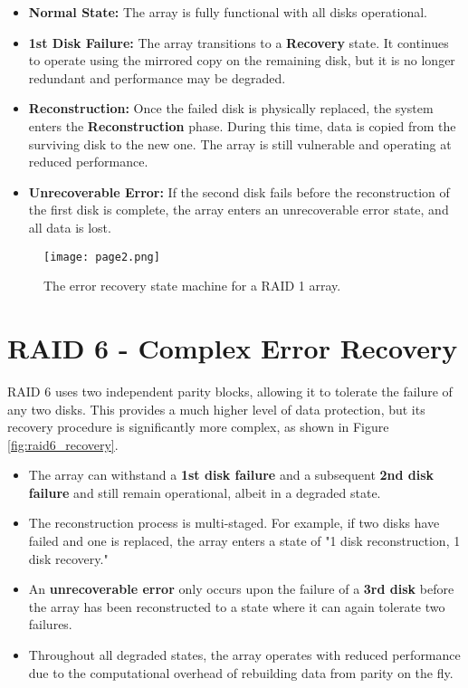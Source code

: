 \begin{itemize}
    \item \textbf{Normal State:} The array is fully functional with all disks operational.
    \item \textbf{1st Disk Failure:} The array transitions to a \textbf{Recovery} state. It continues to operate using the mirrored copy on the remaining disk, but it is no longer redundant and performance may be degraded.
    \item \textbf{Reconstruction:} Once the failed disk is physically replaced, the system enters the \textbf{Reconstruction} phase. During this time, data is copied from the surviving disk to the new one. The array is still vulnerable and operating at reduced performance.
    \item \textbf{Unrecoverable Error:} If the second disk fails before the reconstruction of the first disk is complete, the array enters an unrecoverable error state, and all data is lost.
\end{itemize}

\begin{figure}[h!]
    \centering
    \texttt{[image: page2.png]} %
    \caption{The error recovery state machine for a RAID 1 array.}
    \label{fig:raid1_recovery}
\end{figure}

\section{RAID 6 - Complex Error Recovery}

RAID 6 uses two independent parity blocks, allowing it to tolerate the failure of any two disks. This provides a much higher level of data protection, but its recovery procedure is significantly more complex, as shown in Figure \ref{fig:raid6_recovery}.

\begin{itemize}
    \item The array can withstand a \textbf{1st disk failure} and a subsequent \textbf{2nd disk failure} and still remain operational, albeit in a degraded state.
    \item The reconstruction process is multi-staged. For example, if two disks have failed and one is replaced, the array enters a state of "1 disk reconstruction, 1 disk recovery."
    \item An \textbf{unrecoverable error} only occurs upon the failure of a \textbf{3rd disk} before the array has been reconstructed to a state where it can again tolerate two failures.
    \item Throughout all degraded states, the array operates with reduced performance due to the computational overhead of rebuilding data from parity on the fly.
\end{itemize}

